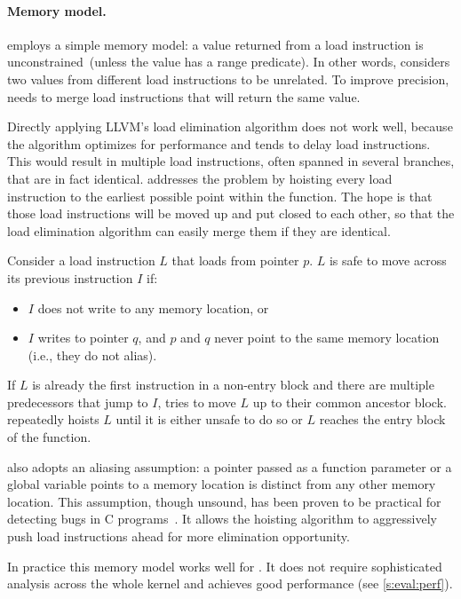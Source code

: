 \paragraph{Memory model.}
\sys employs a simple memory model: a value returned from a load
instruction is unconstrained~(unless the value has a range predicate).
%
In other words, \sys considers two values from different load
instructions to be unrelated.
%
To improve precision, \sys needs to merge load instructions that
will return the same value.

Directly applying LLVM's load elimination algorithm does not work
well, because the algorithm optimizes for performance and tends to
delay load instructions.  This would result in multiple load
instructions, often spanned in several branches, that are in fact
identical.
%
\sys addresses the problem by hoisting every load instruction to
the earliest possible point within the function.  The hope is that
those load instructions will be moved up and put closed to each
other, so that the load elimination algorithm can easily merge them
if they are identical.

Consider a load instruction $L$ that loads from pointer $p$.  $L$ is
safe to move across its previous instruction $I$ if:
\begin{itemize}
\item $I$ does not write to any memory location, or
\item $I$ writes to pointer $q$, and $p$ and $q$ never point to the
same memory location (i.e., they do not alias).
\end{itemize}

If $L$ is already the first instruction in a non-entry block and
there are multiple predecessors that jump to $I$, \sys tries to
move $L$ up to their common ancestor block.  \sys repeatedly hoists $L$
until it is either unsafe to do so or $L$ reaches the entry block of the
function.

\sys also adopts an aliasing assumption: a pointer passed as a
function parameter or a global variable points to a memory location
is distinct from any other memory location.  This assumption, though
unsound, has been proven to be practical for detecting bugs in C
programs~\cite{livshits:ipssa}.  It allows the hoisting algorithm
to aggressively push load instructions ahead for more elimination
opportunity.

In practice this memory model works well for \sys.
It does not require sophisticated analysis across the whole kernel
and achieves good performance (see \autoref{s:eval:perf}).

